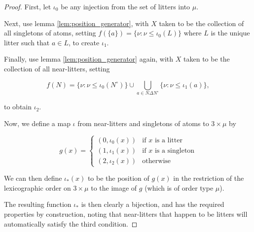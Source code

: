 \documentclass{article}
\theoremstyle{definition}
\theoremstyle{remark}
\begin{document}
\begin{proof}

 First, let $\iota_0$ be any injection from the set of litters into $\mu$.

 Next, use lemma \ref{lem:position_generator}, with $X$ taken to be the collection of all singletons of atoms, setting
$f(\{a\}) = \{ \nu :
\nu
\leq
\iota_0(L) \}$ where
$L$ is the unique litter such that
$a \in L$, to create
$\iota_1$.

 Finally, use lemma \ref{lem:position_generator} again, with $X$ taken to be the collection of all near-litters, setting

 $$f(N) = \{
\nu :
\nu
\leq
\iota_0(N^\circ)
 \} \cup
\bigcup_{a \in N \Delta N^{\circ}}\{
\nu :
\nu
\leq
\iota_1(a)\},$$

 to obtain $\iota_2$.


 Now, we define a map $\iota$
 from near-litters and singletons of atoms to $3
\times
\mu$ by

 $$ g(x) =
\begin{cases}

   (0,
\iota_0(x))
& \text{if $x$ is a litter}
\\

   (1,
\iota_1(x))
& \text{if $x$ is a singleton}
\\

   (2,
\iota_2(x))
& \text{otherwise}

 \end{cases} $$

 We can then define
$\iota_*(x)$ to be the position of
$g(x)$ in the restriction of the lexicographic order on
$3
\times
\mu$ to the image of
$g$ (which is of order type $\mu$).

 The resulting function $\iota_*$
 is then clearly a bijection, and has the required properties by construction, noting that near-litters that happen to be litters will automatically satisfy the third condition.

\end{proof}
\end{document}
